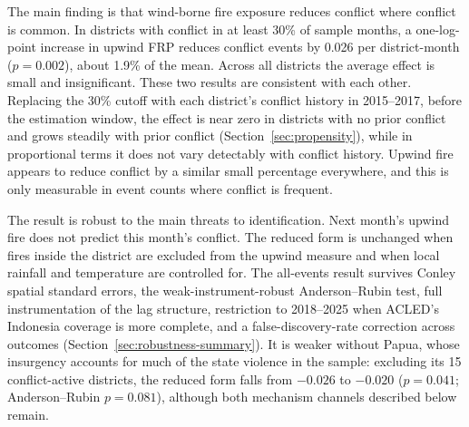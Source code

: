 \documentclass[12pt]{article}
\begin{document}
The main finding is that wind-borne fire exposure reduces conflict where conflict is common. In districts with conflict in at least 30\% of sample months, a one-log-point increase in upwind FRP reduces conflict events by 0.026 per district-month ($p=0.002$), about 1.9\% of the mean. Across all districts the average effect is small and insignificant. These two results are consistent with each other. Replacing the 30\% cutoff with each district's conflict history in 2015--2017, before the estimation window, the effect is near zero in districts with no prior conflict and grows steadily with prior conflict (Section~\ref{sec:propensity}), while in proportional terms it does not vary detectably with conflict history. Upwind fire appears to reduce conflict by a similar small percentage everywhere, and this is only measurable in event counts where conflict is frequent.

The result is robust to the main threats to identification. Next month's upwind fire does not predict this month's conflict. The reduced form is unchanged when fires inside the district are excluded from the upwind measure and when local rainfall and temperature are controlled for. The all-events result survives Conley spatial standard errors, the weak-instrument-robust Anderson--Rubin test, full instrumentation of the lag structure, restriction to 2018--2025 when ACLED's Indonesia coverage is more complete, and a false-discovery-rate correction across outcomes (Section~\ref{sec:robustness-summary}). It is weaker without Papua, whose insurgency accounts for much of the state violence in the sample: excluding its 15 conflict-active districts, the reduced form falls from $-0.026$ to $-0.020$ ($p=0.041$; Anderson--Rubin $p=0.081$), although both mechanism channels described below remain.
\end{document}
